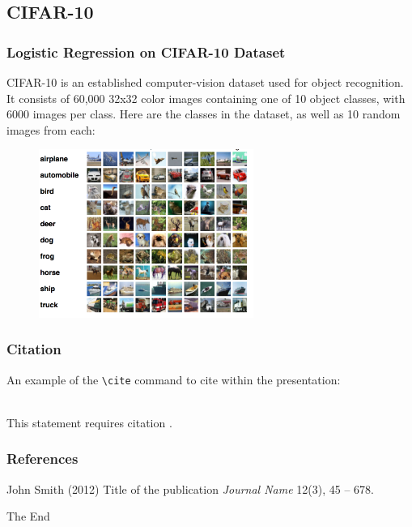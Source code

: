 \documentclass{beamer}
\begin{document}
\subsection{CIFAR-10}
\begin{frame}
\frametitle{Logistic Regression on CIFAR-10 Dataset}
CIFAR-10  is an established computer-vision dataset used for object recognition. It consists of 60,000 32x32 color images containing one of 10 object classes, with 6000 images per class. 
Here are the classes in the dataset, as well as 10 random images from each:
\begin{figure}[t]
\includegraphics[width=7cm]{graphics/cifar-10}
\centering
\end{figure}
\end{frame}


\begin{frame}[fragile] %
\frametitle{Citation}
An example of the \verb|\cite| command to cite within the presentation:\\~

This statement requires citation \cite{p1}.
\end{frame}


\begin{frame}
\frametitle{References}
\footnotesize{
\begin{thebibliography}{99} %
 John Smith (2012)
\newblock Title of the publication
\newblock \emph{Journal Name} 12(3), 45 -- 678.
\end{thebibliography}
}
\end{frame}


\begin{frame}
\Huge{\centerline{The End}}
\end{frame}

\end{document}
